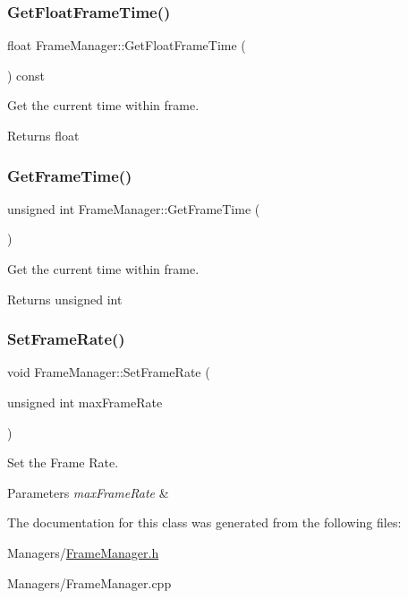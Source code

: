 \subsubsection{\texorpdfstring{Get\+Float\+Frame\+Time()}{GetFloatFrameTime()}}
{\footnotesize\ttfamily float Frame\+Manager\+::\+Get\+Float\+Frame\+Time (\begin{DoxyParamCaption}{ }\end{DoxyParamCaption}) const}



Get the current time within frame. 

\begin{DoxyReturn}{Returns}
float 
\end{DoxyReturn}
\mbox{\label{classFrameManager_a18adc31d8edea896cabd539ae87a0b6d}} 
\subsubsection{\texorpdfstring{Get\+Frame\+Time()}{GetFrameTime()}}
{\footnotesize\ttfamily unsigned int Frame\+Manager\+::\+Get\+Frame\+Time (\begin{DoxyParamCaption}{ }\end{DoxyParamCaption})}



Get the current time within frame. 

\begin{DoxyReturn}{Returns}
unsigned int 
\end{DoxyReturn}
\mbox{\label{classFrameManager_a449eb9187116086d6a5ee53c76c84852}} 
\subsubsection{\texorpdfstring{Set\+Frame\+Rate()}{SetFrameRate()}}
{\footnotesize\ttfamily void Frame\+Manager\+::\+Set\+Frame\+Rate (\begin{DoxyParamCaption}\item[{unsigned int}]{max\+Frame\+Rate }\end{DoxyParamCaption})}



Set the Frame Rate. 


\begin{DoxyParams}{Parameters}
{\em max\+Frame\+Rate} & \\
\hline
\end{DoxyParams}


The documentation for this class was generated from the following files\+:\begin{DoxyCompactItemize}
\item 
Managers/\hyperlink{FrameManager_8h}{Frame\+Manager.\+h}\item 
Managers/Frame\+Manager.\+cpp\end{DoxyCompactItemize}
